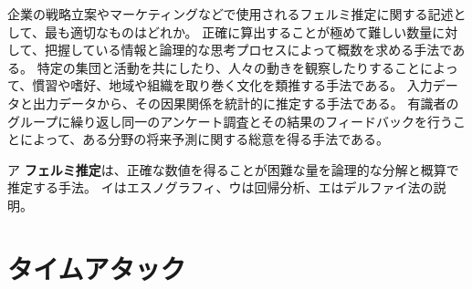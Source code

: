 \begin{itpmon}{%
企業の戦略立案やマーケティングなどで使用されるフェルミ推定に関する記述として、最も適切なものはどれか。}
\sentakushi
  {正確に算出することが極めて難しい数量に対して、把握している情報と論理的な思考プロセスによって概数を求める手法である。}
  {特定の集団と活動を共にしたり、人々の動きを観察したりすることによって、慣習や嗜好、地域や組織を取り巻く文化を類推する手法である。}
  {入力データと出力データから、その因果関係を統計的に推定する手法である。}
  {有識者のグループに繰り返し同一のアンケート調査とその結果のフィードバックを行うことによって、ある分野の将来予測に関する総意を得る手法である。}
\end{itpmon}
\begin{kaisetsu}{ア}
\textbf{フェルミ推定}は、正確な数値を得ることが困難な量を論理的な分解と概算で推定する手法。
イはエスノグラフィ、ウは回帰分析、エはデルファイ法の説明。
\end{kaisetsu}

\section{タイムアタック}

